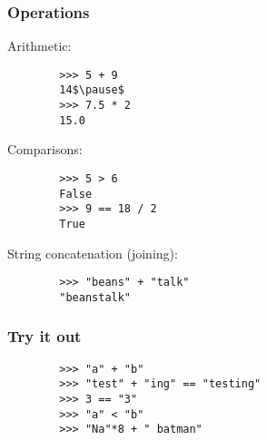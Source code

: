 \documentclass[presentation]{beamer}
\begin{document}
\begin{frame}[fragile]
\begin{itemize}
			
			
			
		\end{itemize}
	\end{frame}
	
	\begin{frame}[fragile]
		\frametitle{Operations}
		
		Arithmetic:
		
		\begin{lstlisting}
		>>> 5 + 9
		14$\pause$
		>>> 7.5 * 2
		15.0
		\end{lstlisting}
		
		\pause
		
		Comparisons:
		
		\begin{lstlisting}
		>>> 5 > 6
		False
		>>> 9 == 18 / 2
		True
		\end{lstlisting}
		
		\pause
		
		String concatenation (joining):
		
		\begin{lstlisting}
		>>> "beans" + "talk"
		"beanstalk"
		\end{lstlisting}
	\end{frame}
	
	\begin{frame}[fragile]
		\frametitle{Try it out}
		
		\begin{lstlisting}
		>>> "a" + "b"
		>>> "test" + "ing" == "testing"
		>>> 3 == "3"
		>>> "a" < "b"
		>>> "Na"*8 + " batman"
		\end{lstlisting}
	\end{frame}
\end{document}
